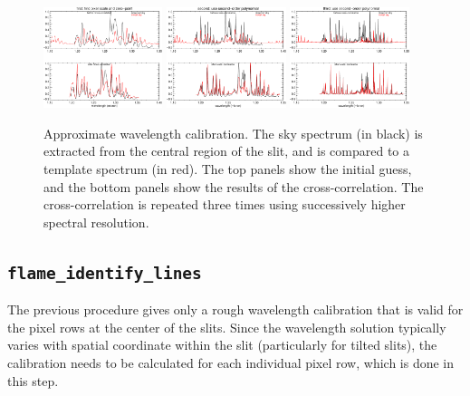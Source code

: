 \documentclass[a4paper, notitlepage]{article}
\begin{document}
\begin{figure}[tbp]
\begin{minipage}{\textwidth}
   \centering
 \includegraphics[width=0.31\textwidth]{wavecal1}
   \hspace*{0.01\textwidth}
 \includegraphics[width=0.31\textwidth]{wavecal2}
  \hspace*{0.01\textwidth}
 \includegraphics[width=0.31\textwidth]{wavecal3}
\end{minipage}
\caption{Approximate wavelength calibration. The sky spectrum (in black) is extracted from the central region of the slit, and is compared to a template spectrum (in red). The top panels show the initial guess, and the bottom panels show the results of the cross-correlation. The cross-correlation is repeated three times using successively higher spectral resolution.}
\label{fig:wavecal_approx}
\end{figure}


\subsection{\texttt{flame\_identify\_lines}}


The previous procedure gives only a rough wavelength calibration that is valid for the pixel rows at the center of the slits. Since the wavelength solution typically varies with spatial coordinate within the slit (particularly for tilted slits), the calibration needs to be calculated for each individual pixel row, which is done in this step.
\end{document}
